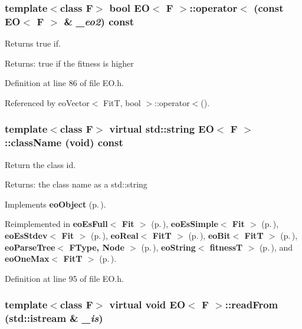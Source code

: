 \subsubsection{\setlength{\rightskip}{0pt plus 5cm}template$<$class F$>$ bool {\bf EO}$<$ F $>$::operator$<$ (const {\bf EO}$<$ F $>$ \& {\em \_\-eo2}) const\hspace{0.3cm}{\tt  [inline]}}\label{class_e_o_a6}


Returns true if. 

\begin{Desc}
\item[Returns:]true if the fitness is higher \end{Desc}


Definition at line 86 of file EO.h.

Referenced by eo\-Vector$<$ Fit\-T, bool $>$::operator$<$().
\subsubsection{\setlength{\rightskip}{0pt plus 5cm}template$<$class F$>$ virtual std::string {\bf EO}$<$ F $>$::class\-Name (void) const\hspace{0.3cm}{\tt  [inline, virtual]}}\label{class_e_o_z10_0}


Return the class id. 

\begin{Desc}
\item[Returns:]the class name as a std::string \end{Desc}


Implements {\bf eo\-Object} {\rm (p.\,\pageref{classeo_object_a1})}.

Reimplemented in {\bf eo\-Es\-Full$<$ Fit $>$} {\rm (p.\,\pageref{classeo_es_full_a1})}, {\bf eo\-Es\-Simple$<$ Fit $>$} {\rm (p.\,\pageref{classeo_es_simple_a1})}, {\bf eo\-Es\-Stdev$<$ Fit $>$} {\rm (p.\,\pageref{classeo_es_stdev_a1})}, {\bf eo\-Real$<$ Fit\-T $>$} {\rm (p.\,\pageref{classeo_real_a1})}, {\bf eo\-Bit$<$ Fit\-T $>$} {\rm (p.\,\pageref{classeo_bit_a1})}, {\bf eo\-Parse\-Tree$<$ FType, Node $>$} {\rm (p.\,\pageref{classeo_parse_tree_a4})}, {\bf eo\-String$<$ fitness\-T $>$} {\rm (p.\,\pageref{classeo_string_z26_0})}, and {\bf eo\-One\-Max$<$ Fit\-T $>$} {\rm (p.\,\pageref{classeo_one_max_a2})}.

Definition at line 95 of file EO.h.
\subsubsection{\setlength{\rightskip}{0pt plus 5cm}template$<$class F$>$ virtual void {\bf EO}$<$ F $>$::read\-From (std::istream \& {\em \_\-is})\hspace{0.3cm}{\tt  [inline, virtual]}}\label{class_e_o_z10_1}


